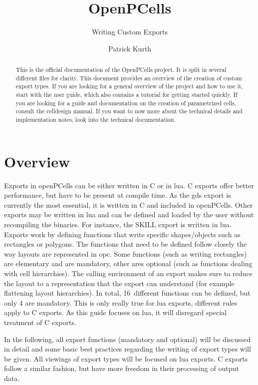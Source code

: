 

\title{OpenPCells}
\subtitle{Writing Custom Exports}
\author{Patrick Kurth}


\maketitle
\begin{abstract}
    \noindent This is the official documentation of the OpenPCells project. It is split in several different files for clarity. 
    This document provides an overview of the creation of custom export types.
    If you are looking for a general overview of the project and how to use it, start with the user guide, which also contains a tutorial for getting started quickly. 
    If you are looking for a guide and documentation on the creation of parametrized cells, consult the celldesign manual.
    If you want to now more about the technical details and implementation notes, look into the technical documentation.
\end{abstract}

\section{Overview}
Exports in openPCells can be either written in C or in lua.
C exports offer better performance, but have to be present at compile time.
As the gds export is currently the most essential, it is written in C and included in openPCells.
Other exports may be written in lua and can be defined and loaded by the user without recompiling the binaries.
For instance, the SKILL export is written in lua.
Exports work by defining functions that write specific shapes/objects such as rectangles or polygons.
The functions that need to be defined follow closely the way layouts are represented in opc.
Some functions (such as writing rectangles) are elementary and are mandatory, other ares optional (such as functions dealing with cell hierarchies).
The calling environment of an export makes sure to reduce the layout to a representation that the export can understand (for example flattening layout hierarchies).
In total, 16~different functions can be defined, but only 4 are mandatory.
This is only really true for lua exports, different rules apply to C exports.
As this guide focuses on lua, it will disregard special treatment of C exports.

In the following, all export functions (mandatory and optional) will be discussed in detail and some basic best practices regarding the writing of export types will be given.
All viewings of export types will be focused on lua exports.
C exports follow a similar fashion, but have more freedom in their processing of output data.


